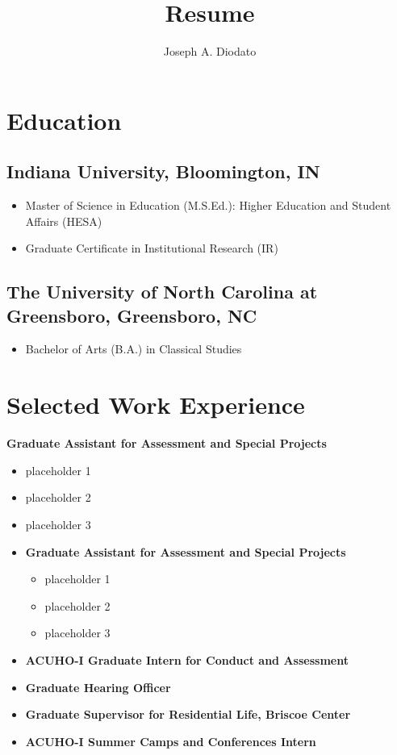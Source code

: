\documentclass{article}
\begin{document}
\title{Resume}
\author{Joseph A. Diodato}

\maketitle

\section*{Education} 
  

\subsection*{Indiana University, Bloomington, IN}
\begin{itemize}
\item Master of Science in Education (M.S.Ed.): Higher Education and  Student Affairs (HESA)
\item Graduate Certificate in Institutional Research (IR)
\end{itemize}

\subsection*{The University of North Carolina at Greensboro, Greensboro, NC}
\begin{itemize}
\item Bachelor of Arts (B.A.) in Classical Studies
\end{itemize}

\section*{Selected Work Experience}

\textbf{Graduate Assistant for Assessment and Special Projects}
\begin{itemize}
\item placeholder 1
\item placeholder 2
\item placeholder 3
\end{itemize}

\begin{itemize}
\item \textbf{Graduate Assistant for Assessment and Special
    Projects}
  \begin{itemize}
  \item placeholder 1
  \item placeholder 2
  \item placeholder 3
  \end{itemize}
\item \textbf{ACUHO-I Graduate Intern for Conduct and Assessment}
\item \textbf{Graduate Hearing Officer}
\item \textbf{Graduate Supervisor for Residential Life, Briscoe Center}
\item \textbf{ACUHO-I Summer Camps and Conferences Intern}
\end{itemize}
\end{document}
